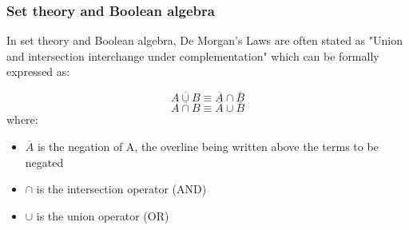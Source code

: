 \documentclass[12pt]{report}
\begin{document}
\subsubsection{Set theory and Boolean algebra}
In set theory and Boolean algebra, De Morgan's Laws are often stated as "Union and intersection interchange under complementation" which can be formally expressed as:

\[\overline{A \cup B}\equiv\overline{A} \cap \overline{B}\]
\[\overline{A \cap B}\equiv\overline{A} \cup \overline{B}\]
where:
\begin{itemize}
\item $\overline{A}$ is the negation of A, the overline being written above the terms to be negated
\item $\cap$ is the intersection operator (AND)
\item $\cup$ is the union operator (OR)
\end{itemize}
\end{document}
